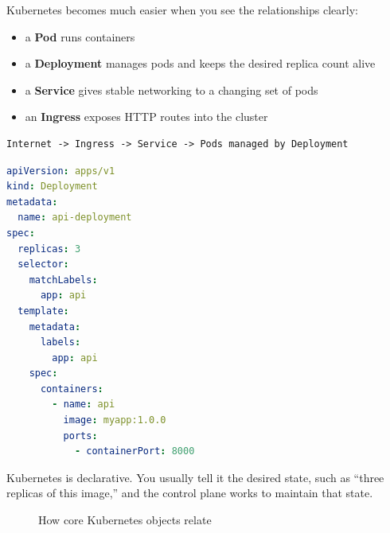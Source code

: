\documentclass[12pt, a4paper, oneside]{book}
\begin{document}
Kubernetes becomes much easier when you see the relationships clearly:
\begin{itemize}[leftmargin=2em]
    \item a \textbf{Pod} runs containers
    \item a \textbf{Deployment} manages pods and keeps the desired replica count alive
    \item a \textbf{Service} gives stable networking to a changing set of pods
    \item an \textbf{Ingress} exposes HTTP routes into the cluster
\end{itemize}

\begin{lstlisting}[caption={Conceptual Kubernetes flow}]
Internet -> Ingress -> Service -> Pods managed by Deployment
\end{lstlisting}

\begin{lstlisting}[language=yaml, caption={Minimal Kubernetes deployment example}]
apiVersion: apps/v1
kind: Deployment
metadata:
  name: api-deployment
spec:
  replicas: 3
  selector:
    matchLabels:
      app: api
  template:
    metadata:
      labels:
        app: api
    spec:
      containers:
        - name: api
          image: myapp:1.0.0
          ports:
            - containerPort: 8000
\end{lstlisting}

\begin{notebox}
Kubernetes is declarative. You usually tell it the desired state, such as ``three replicas of this image,'' and the control plane works to maintain that state.
\end{notebox}

\begin{figure}[H]
\centering
{}
\caption{How core Kubernetes objects relate}
\label{fig:kubernetes-objects}
\end{figure}
\end{document}
